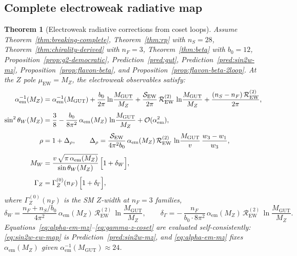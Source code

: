 \documentclass[11pt]{article}
\theoremstyle{plain}
\newtheorem{theorem}{Theorem}[section]
\theoremstyle{definition}
\theoremstyle{remark}
\numberwithin{equation}{section}
\begin{document}
\subsection{Complete electroweak radiative map}
\label{sec:ew-precision:complete}

\begin{theorem}[Electroweak radiative corrections from coset loops]
\label{thm:ew-radiative-complete}
Assume Theorem~\ref{thm:breaking-complete}, Theorem~\ref{thm:rp} with
$n_S=28$, Theorem~\ref{thm:chirality-derived} with $n_F=3$,
Theorem~\ref{thm:beta} with $b_0=12$, Proposition~\ref{prop:g2-democratic},
Prediction~\ref{pred:gut}, Prediction~\ref{pred:sin2w-mz},
Proposition~\ref{prop:flavon-beta}, and Proposition~\ref{prop:flavon-beta-2loop}.
At the $Z$ pole $\mu_{\mathrm{EW}}=M_Z$, the electroweak observables satisfy:
\begin{align}
  \alpha_{\mathrm{em}}^{-1}(M_Z)
  &=
  \alpha_{\mathrm{em}}^{-1}(M_{\mathrm{GUT}})
  + \frac{b_0}{2\pi}\ln\!\frac{M_{\mathrm{GUT}}}{M_Z}
  + \frac{\mathcal{S}_{\mathrm{EW}}}{2\pi}\,
    \mathcal{R}_{\mathrm{EW}}^{(2)}\,
    \ln\!\frac{M_{\mathrm{GUT}}}{M_Z}
  + \frac{(n_S-n_F)\,\mathcal{R}_{\mathrm{EW}}^{(2)}}{2\pi},
  \label{eq:alpha-em-mz}\\[4pt]
  \sin^2\theta_W(M_Z)
  &=
  \frac38
  - \frac{b_0}{8\pi^2}\,\alpha_{\mathrm{em}}(M_Z)\,
    \ln\!\frac{M_{\mathrm{GUT}}}{M_Z}
  + \mathcal{O}(\alpha_{\mathrm{em}}^2),
  \label{eq:sin2w-ew-map}\\[4pt]
  \rho
  &=
  1 + \Delta_\rho,
  \qquad
  \Delta_\rho
  =
  \frac{\mathcal{S}_{\mathrm{EW}}}{4\pi^2 b_0}\,
  \alpha_{\mathrm{em}}(M_Z)\,
  \mathcal{R}_{\mathrm{EW}}^{(2)}\,
  \ln\!\frac{M_{\mathrm{GUT}}}{v}\,
  \frac{w_3-w_1}{w_3},
  \label{eq:rho-coset}\\[4pt]
  M_W
  &=
  \frac{v\,\sqrt{\pi\,\alpha_{\mathrm{em}}(M_Z)}}{\sin\theta_W(M_Z)}\,
  \Bigl[1+\delta_W\Bigr],
  \label{eq:mw-coset}\\[4pt]
  \Gamma_Z
  &=
  \Gamma_Z^{(0)}(n_F)\,
  \Bigl[1+\delta_\Gamma\Bigr],
  \label{eq:gamma-z-coset}
\end{align}
where $\Gamma_Z^{(0)}(n_F)$ is the SM $Z$-width at $n_F=3$ families,
\begin{equation}\label{eq:mw-gamma-deltas}
  \delta_W
  =
  \frac{n_F+n_S/b_0}{4\pi^2}\,
  \alpha_{\mathrm{em}}(M_Z)\,
  \mathcal{R}_{\mathrm{EW}}^{(2)}\,
  \ln\!\frac{M_{\mathrm{GUT}}}{M_Z},
  \qquad
  \delta_\Gamma
  =
  -\,\frac{n_F}{b_0\cdot 8\pi^2}\,
  \alpha_{\mathrm{em}}(M_Z)\,
  \mathcal{R}_{\mathrm{EW}}^{(2)}\,
  \ln\!\frac{M_{\mathrm{GUT}}}{M_Z}.
\end{equation}
Equations~\eqref{eq:alpha-em-mz}--\eqref{eq:gamma-z-coset} are evaluated
self-consistently: \eqref{eq:sin2w-ew-map} is Prediction~\ref{pred:sin2w-mz},
and \eqref{eq:alpha-em-mz} fixes $\alpha_{\mathrm{em}}(M_Z)$ given
$\alpha_{\mathrm{em}}^{-1}(M_{\mathrm{GUT}})\approx24$.
\end{theorem}
\end{document}
